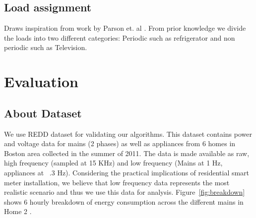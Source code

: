 \documentclass[conference]{IEEEtran}
\newcommand{\figref}[1]{Figure~\ref{#1}}
\begin{document}

\subsection{Load assignment}
Draws inspiration from work by Parson et. al \cite{parson2012_aaai}. From prior knowledge we divide the loads into two different categories: Periodic such as refrigerator and non periodic such as Television.

\section{Evaluation}
\subsection{About Dataset}

We use REDD dataset \cite{redd} for validating our algorithms. This dataset contains power and voltage data for mains (2 phases) as well as appliances from 6 homes in Boston area collected in the summer of 2011. The data is made available as raw, high frequency (sampled at 15 KHz) and low frequency (Mains at 1 Hz, appliances at ~.3 Hz). Considering the practical implications of residential smart meter installation, we believe that low frequency data represents the most realistic scenario and thus we use this data for analysis. \figref{fig:breakdown} shows 6 hourly breakdown of energy consumption across the different mains in Home 2 .
\end{document}
